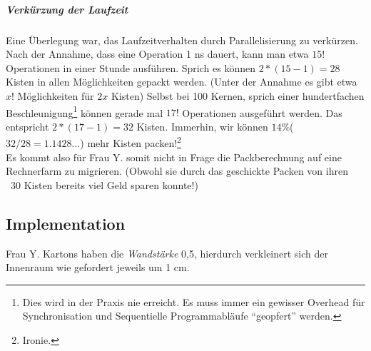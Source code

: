 \subparagraph{Verkürzung der Laufzeit} Eine Überlegung war, das Laufzeitverhalten durch Parallelisierung zu verkürzen.
Nach der Annahme, dass eine Operation 1 ns dauert, kann man etwa $15!$ Operationen in einer Stunde ausführen.
Sprich es können $2*(15-1)=28$ Kisten in allen Möglichkeiten gepackt werden. (Unter der Annahme es gibt etwa $x!$ Möglichkeiten für $2x$ Kisten)
Selbst bei 100 Kernen, sprich einer hundertfachen Beschleunigung\footnote{Dies wird in der Praxis nie erreicht. Es muss immer ein gewisser Overhead für Synchronisation und Sequentielle Programmabläufe ``geopfert'' werden.}
können gerade mal $17!$ Operationen ausgeführt werden. Das entspricht $2*(17-1)=32$ Kisten. Immerhin, wir können $14\%$($32/28=1.1428\dots$) mehr Kisten packen!\footnote{Ironie.} \\
Es kommt also für Frau Y. somit nicht in Frage die Packberechnung auf eine Rechnerfarm zu migrieren. (Obwohl sie durch das geschickte Packen von ihren ~30 Kisten bereits viel Geld sparen konnte!)
\subsection{Implementation}
Frau Y. Kartons haben die \emph{Wandstärke} 0,5, hierdurch verkleinert sich der Innenraum wie gefordert jeweils um 1 cm.
